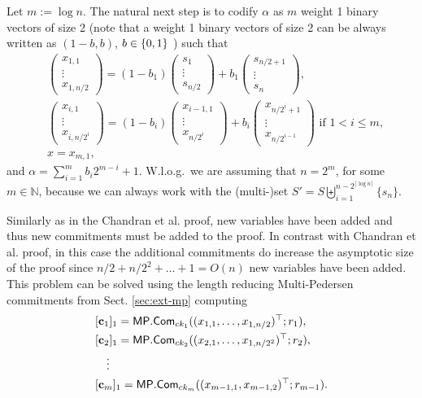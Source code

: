 Let $m:=\log n$. The natural next step is to codify $\alpha$ as $m$ weight 1 binary vectors of size 2 (note that a weight 1 binary vectors of size 2 can be always written as $(1-b,b)$, $b\in\{0,1\}$ ) such that
\begin{align}
&\begin{pmatrix}
x_{1,1}\\\vdots\\ x_{1,n/2}
\end{pmatrix}
=
(1-b_1)
\begin{pmatrix}
s_1\\\vdots\\ s_{n/2}
\end{pmatrix}
+
b_1
\begin{pmatrix}
s_{n/2+1}\\\vdots\\ s_{n}
\end{pmatrix},\label{eq-log-1}\\
&\begin{pmatrix}
x_{i,1}\\\vdots\\x_{i,n/{2^i}}
\end{pmatrix}
=
(1-b_i)
\begin{pmatrix}
x_{i-1,1}\\\vdots\\x_{n/{2^i}}
\end{pmatrix}
+
b_i
\begin{pmatrix}
x_{n/{2^i}+1}\\\vdots\\x_{n/{2^{i-1}}}
\end{pmatrix}
\text{ if } 1 <  i \leq m,\label{eq-log-2}\\
&
x= x_{m,1}\label{eq-log-3},
\end{align}
and $\alpha=\sum_{i=1}^{m}b_i2^{m-i}+1$.
W.l.o.g.~we are assuming that $n=2^m$, for some $m\in\mathbb{N}$, because we can always work with the (multi-)set $S'=S\biguplus_{i=1}^{n-2^{\lceil \log n \rceil}}\{s_n\}$.

Similarly as in the Chandran et al. proof, new variables have been added and thus new commitments must be added to the proof. In contrast with Chandran et al. proof, in this case the additional commitments do increase the asymptotic size of the proof since $n/2+n/2^2+\ldots+1=O(n)$ new variables have been added. This problem can be solved using the length reducing Multi-Pedersen commitments from Sect. \ref{sec:ext-mp} computing
\begin{align*}
&[\mathbf{c}_1]_1=\mathsf{MP}.\mathsf{Com}_{ck_1}((x_{1,1},\ldots,x_{1,n/2})^\top;r_1),\\
&[\mathbf{c}_2]_1=\mathsf{MP}.\mathsf{Com}_{ck_2}((x_{2,1},\ldots,x_{1,n/2^2})^\top;r_2),\\
&\quad\vdots\\
&[\mathbf{c}_{m}]_1=\mathsf{MP}.\mathsf{Com}_{ck_{m}}((x_{m-1,1},x_{m-1,2})^\top;r_{m-1}).
\end{align*}

